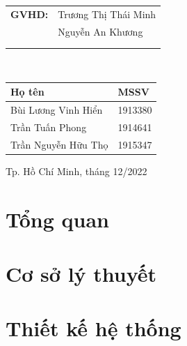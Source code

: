 \documentclass[a4paper]{report}
\theoremstyle{definition}
\begin{document}
\begin{titlepage}
	\begin{center}
		\begin{tabular}{m{1.5 cm}m{5.5cm}}
			\textbf{GVHD:} & Trương Thị Thái Minh \\
			& Nguyễn An Khương \\
			\\ \\
		\end{tabular}\\
		\begin{tabular}{m{5cm}m{2cm}}
			\hline
			\textbf{Họ tên}     & \textbf{MSSV} \\
			\hline
			Bùi Lương Vinh Hiển & 1913380       \\
			Trần Tuấn Phong     & 1914641       \\
			Trần Nguyễn Hữu Thọ & 1915347       \\
		\end{tabular}
	\end{center}


	\vspace{1.5cm}
	\begin{center}
		{\footnotesize Tp. Hồ Chí Minh, tháng 12/2022}
	\end{center}
\end{titlepage}

\newpage
\tableofcontents


\chapter{Tổng quan}



\chapter{Cơ sở lý thuyết}
% 


\chapter{Thiết kế hệ thống}


\newpage


\newpage

\end{document}
